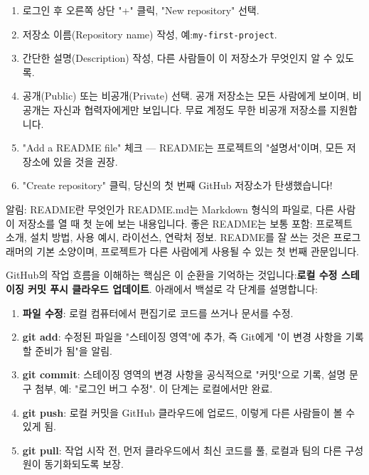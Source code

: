 \begin{enumerate}
  \item 로그인 후 오른쪽 상단 "+" 클릭, "New repository" 선택.
  \item 저장소 이름(Repository name) 작성, 예:\texttt{my-\allowbreak first-\allowbreak project}.
  \item 간단한 설명(Description) 작성, 다른 사람들이 이 저장소가 무엇인지 알 수 있도록.
  \item 공개(Public) 또는 비공개(Private) 선택. 공개 저장소는 모든 사람에게 보이며, 비공개는 자신과 협력자에게만 보입니다. 무료 계정도 무한 비공개 저장소를 지원합니다.
  \item "Add a README file" 체크 — README는 프로젝트의 "설명서"이며, 모든 저장소에 있을 것을 권장.
  \item "Create repository" 클릭, 당신의 첫 번째 GitHub 저장소가 탄생했습니다!
\end{enumerate}

\begin{tcbinfo}{알림: README란 무엇인가}
README.md는 Markdown 형식의 파일로, 다른 사람이 저장소를 열 때 첫 눈에 보는 내용입니다. 좋은 README는 보통 포함: 프로젝트 소개, 설치 방법, 사용 예시, 라이선스, 연락처 정보. README를 잘 쓰는 것은 프로그래머의 기본 소양이며, 프로젝트가 다른 사람에게 사용될 수 있는 첫 번째 관문입니다.

\end{tcbinfo}


GitHub의 작업 흐름을 이해하는 핵심은 이 순환을 기억하는 것입니다:\textbf{로컬 수정 스테이징 커밋 푸시 클라우드 업데이트}. 아래에서 백설로 각 단계를 설명합니다:

\begin{enumerate}
  \item \textbf{파일 수정}: 로컬 컴퓨터에서 편집기로 코드를 쓰거나 문서를 수정.
  \item \textbf{git add}: 수정된 파일을 "스테이징 영역"에 추가, 즉 Git에게 "이 변경 사항을 기록할 준비가 됨"을 알림.
  \item \textbf{git commit}: 스테이징 영역의 변경 사항을 공식적으로 "커밋"으로 기록, 설명 문구 첨부, 예: "로그인 버그 수정". 이 단계는 로컬에서만 완료.
  \item \textbf{git push}: 로컬 커밋을 GitHub 클라우드에 업로드, 이렇게 다른 사람들이 볼 수 있게 됨.
  \item \textbf{git pull}: 작업 시작 전, 먼저 클라우드에서 최신 코드를 풀, 로컬과 팀의 다른 구성원이 동기화되도록 보장.
\end{enumerate}

